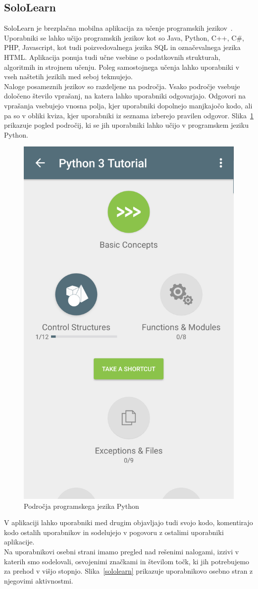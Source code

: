 \documentclass[a4paper, 12pt]{book}
\begin{document}
\subsection{SoloLearn}
SoloLearn je brezplačna mobilna aplikacija za učenje programskih jezikov~\cite{Sololearn_app}. Uporabniki se lahko učijo programskih jezikov kot so Java, Python, C++, C\#, PHP, Javascript, kot tudi poizvedovalnega jezika SQL in označevalnega jezika HTML. Aplikacija ponuja tudi učne vsebine o podatkovnih strukturah, algoritmih in strojnem učenju. Poleg samostojnega učenja lahko uporabniki v vseh naštetih jezikih med seboj tekmujejo.\\Naloge posameznih jezikov so razdeljene na področja. Vsako področje vsebuje določeno število vprašanj, na katera lahko uporabniki odgovarjajo. Odgovori na vprašanja vsebujejo vnosna polja, kjer uporabniki dopolnejo manjkajočo kodo, ali pa so v obliki kviza, kjer uporabniki iz seznama izberejo pravilen odgovor. Slika~\ref{Python3} prikazuje pogled področij, ki se jih uporabniki lahko učijo v programskem jeziku Python.
\begin{figure}[H]
\centering
\includegraphics[height=0.7\textwidth]{slike/Python3}
\caption{Področja programskega jezika Python}\label{Python3}
\end{figure}
\noindent V aplikaciji lahko uporabniki med drugim objavljajo tudi svojo kodo, komentirajo kodo ostalih uporabnikov in sodelujejo v pogovoru z ostalimi uporabniki aplikacije.\\Na uporabnikovi osebni strani imamo pregled nad rešenimi nalogami, izzivi v katerih smo sodelovali, osvojenimi značkami in številom točk, ki jih potrebujemo za prehod v višjo stopnjo. Slika~\ref{sololearn} prikazuje uporabnikovo osebno stran z njegovimi aktivnostmi.
\end{document}
